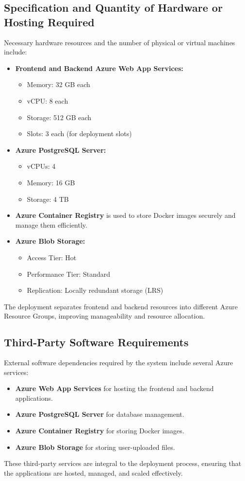 \subsection{Specification and Quantity of Hardware or Hosting Required}
Necessary hardware resources and the number of physical or virtual machines include:
\begin{itemize}
    \item \textbf{Frontend and Backend Azure Web App Services:}
    \begin{itemize}
        \item Memory: 32 GB each
        \item vCPU: 8 each
        \item Storage: 512 GB each
        \item Slots: 3 each (for deployment slots)
    \end{itemize}
    \item \textbf{Azure PostgreSQL Server:}
    \begin{itemize}
        \item vCPUs: 4
        \item Memory: 16 GB
        \item Storage: 4 TB
    \end{itemize}
    \item \textbf{Azure Container Registry} is used to store Docker images securely and manage them efficiently.
    \item \textbf{Azure Blob Storage:}
    \begin{itemize}
        \item Access Tier: Hot
        \item Performance Tier: Standard
        \item Replication: Locally redundant storage (LRS)
    \end{itemize}
\end{itemize}
The deployment separates frontend and backend resources into different Azure Resource Groups, improving manageability and resource allocation.

\subsection{Third-Party Software Requirements}
External software dependencies required by the system include several Azure services:
\begin{itemize}
    \item \textbf{Azure Web App Services} for hosting the frontend and backend applications.
    \item \textbf{Azure PostgreSQL Server} for database management.
    \item \textbf{Azure Container Registry} for storing Docker images.
    \item \textbf{Azure Blob Storage} for storing user-uploaded files.
\end{itemize}
These third-party services are integral to the deployment process, ensuring that the applications are hosted, managed, and scaled effectively.

